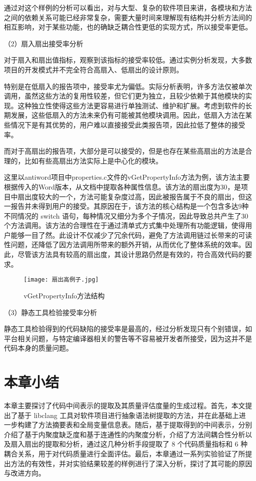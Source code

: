 通过对这个样例的分析可以看出，对与大型、复杂的软件项目来讲，各模块和方法之间的依赖关系可能已经非常复杂，需要大量时间来理解现有结构并分析方法间的相互影响，对于某些功能，也的确缺乏耦合性更低的实现方式，所以接受率更低。

（2）扇入扇出接受率分析

对于扇入和扇出值指标，观察到该指标的接受率较低。通过实例分析发现，大多数项目的开发模式并不完全符合高扇入、低扇出的设计原则。

特别是在低扇入的报告项中，接受率尤为偏低。实际分析表明，许多方法仅被单次调用，虽然这些方法的复用性较差，但它们更为独立，且较少依赖于其他模块的实现。这种独立性使得这些方法更容易进行单独测试、维护和扩展。考虑到软件的长期发展，这些低扇入的方法未来仍有可能被其他模块调用。因此，低扇入方法在某些情况下是有其优势的，用户难以直接接受此类报告项，因此拉低了整体的接受率。

而对于高扇出的报告项，大部分是可以接受的，但是也存在某些高扇出的方法是合理的，比如有些高扇出方法实际上是中心化的模块。

这里以antiword项目中properties.c文件的vGetPropertyInfo方法为例，该方法主要根据传入的Word版本，从文档中提取各种属性信息。该方法的扇出度为30，是项目中扇出度较大的一个，方法可能复杂度过高，因此被报告属于不良的扇出，但这一报告并未得到用户的接受。其原因在于，该方法的核心结构是一个包含多达9种不同情况的 switch 语句，每种情况又细分为多个子情况，因此导致总共产生了30个方法调用。该方法的合理性在于通过清单式方式集中处理所有功能逻辑，使得用户能够一目了然。此设计不仅减少了冗余代码，避免了方法调用链过长带来的可读性问题，还降低了因方法调用所带来的额外开销，从而优化了整体系统的效率。因此，尽管该方法具有较高的扇出度，其设计思路仍然是有效的，符合高效代码的要求。

\begin{figure}[h]
\centering
\texttt{[image: 扇出高例子.jpg]}
\caption{vGetPropertyInfo方法结构}
\end{figure}

（3）静态工具检验接受率分析

静态工具检验得到的代码缺陷的接受率是最高的，经过分析发现只有个别错误，如平台相关问题，与特定编译器相关的警告等不容易被开发者所接受，因为这并不是代码本身的质量问题。

\section{本章小结}

本章主要探讨了代码中间表示的提取及其质量评估度量的生成过程。首先，本文提出了基于 libclang 工具对软件项目进行抽象语法树提取的方法，并在此基础上进一步构建了方法摘要表和全局变量信息表。随后，基于提取得到的中间表示，分别介绍了基于内聚度缺乏度和基于连通性的内聚度分析，介绍了方法间耦合性分析以及扇入扇出的提取和分析，通过这几种分析手段提取了 8 个代码质量指标和 6 种耦合关系，用于对代码质量进行全面评估。最后，本章通过一系列实验验证了所提出方法的有效性，并对实验结果较差的样例进行了深入分析，探讨了其可能的原因与改进方向。

